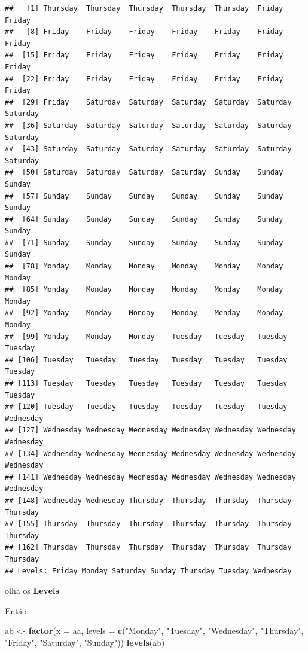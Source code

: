 \documentclass[]{book}
\newenvironment{Shaded}{\begin{snugshade}}{\end{snugshade}}
\newcommand{\KeywordTok}[1]{\textcolor[rgb]{0.13,0.29,0.53}{\textbf{#1}}}
\newcommand{\DataTypeTok}[1]{\textcolor[rgb]{0.13,0.29,0.53}{#1}}
\newcommand{\StringTok}[1]{\textcolor[rgb]{0.31,0.60,0.02}{#1}}
\newcommand{\NormalTok}[1]{#1}
\begin{document}
\begin{verbatim}
##   [1] Thursday  Thursday  Thursday  Thursday  Thursday  Friday    Friday   
##   [8] Friday    Friday    Friday    Friday    Friday    Friday    Friday   
##  [15] Friday    Friday    Friday    Friday    Friday    Friday    Friday   
##  [22] Friday    Friday    Friday    Friday    Friday    Friday    Friday   
##  [29] Friday    Saturday  Saturday  Saturday  Saturday  Saturday  Saturday 
##  [36] Saturday  Saturday  Saturday  Saturday  Saturday  Saturday  Saturday 
##  [43] Saturday  Saturday  Saturday  Saturday  Saturday  Saturday  Saturday 
##  [50] Saturday  Saturday  Saturday  Saturday  Sunday    Sunday    Sunday   
##  [57] Sunday    Sunday    Sunday    Sunday    Sunday    Sunday    Sunday   
##  [64] Sunday    Sunday    Sunday    Sunday    Sunday    Sunday    Sunday   
##  [71] Sunday    Sunday    Sunday    Sunday    Sunday    Sunday    Sunday   
##  [78] Monday    Monday    Monday    Monday    Monday    Monday    Monday   
##  [85] Monday    Monday    Monday    Monday    Monday    Monday    Monday   
##  [92] Monday    Monday    Monday    Monday    Monday    Monday    Monday   
##  [99] Monday    Monday    Monday    Tuesday   Tuesday   Tuesday   Tuesday  
## [106] Tuesday   Tuesday   Tuesday   Tuesday   Tuesday   Tuesday   Tuesday  
## [113] Tuesday   Tuesday   Tuesday   Tuesday   Tuesday   Tuesday   Tuesday  
## [120] Tuesday   Tuesday   Tuesday   Tuesday   Tuesday   Tuesday   Wednesday
## [127] Wednesday Wednesday Wednesday Wednesday Wednesday Wednesday Wednesday
## [134] Wednesday Wednesday Wednesday Wednesday Wednesday Wednesday Wednesday
## [141] Wednesday Wednesday Wednesday Wednesday Wednesday Wednesday Wednesday
## [148] Wednesday Wednesday Thursday  Thursday  Thursday  Thursday  Thursday 
## [155] Thursday  Thursday  Thursday  Thursday  Thursday  Thursday  Thursday 
## [162] Thursday  Thursday  Thursday  Thursday  Thursday  Thursday  Thursday 
## Levels: Friday Monday Saturday Sunday Thursday Tuesday Wednesday
\end{verbatim}

olha os \textbf{Levels}

Então:

\begin{Shaded}
\begin{Highlighting}[]
\NormalTok{ab <-}\StringTok{ }\KeywordTok{factor}\NormalTok{(}\DataTypeTok{x =}\NormalTok{ aa,}
             \DataTypeTok{levels =} \KeywordTok{c}\NormalTok{(}\StringTok{"Monday"}\NormalTok{, }\StringTok{"Tuesday"}\NormalTok{,  }\StringTok{"Wednesday"}\NormalTok{,  }\StringTok{"Thursday"}\NormalTok{,}
                        \StringTok{"Friday"}\NormalTok{, }\StringTok{"Saturday"}\NormalTok{, }\StringTok{"Sunday"}\NormalTok{))}
\KeywordTok{levels}\NormalTok{(ab)}
\end{Highlighting}
\end{Shaded}
\end{document}
